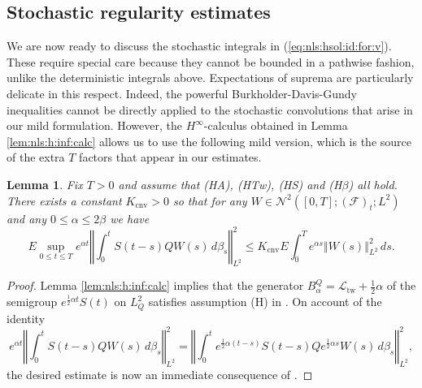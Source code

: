 \documentclass[10pt]{articleHJ}
\newcommand{\norm}[1]{\left\Vert#1\right\Vert}		%
\newcommand{\sref}[1]{(\ref{#1})}                       %
\newtheorem{lem}[thm]{Lemma}
\numberwithin{equation}{section}
\begin{document}
\subsection{Stochastic regularity estimates}
\label{sec:nls:reg:ests:st}

We are now ready to discuss the stochastic integrals
in \sref{eq:nls:hsol:id:for:v}.
These require special care because they cannot be bounded
in a pathwise fashion, unlike the deterministic integrals above.
Expectations of suprema are particularly delicate in this respect.
Indeed, the powerful Burkholder-Davis-Gundy inequalities cannot
be directly applied to the stochastic convolutions that arise in our
mild formulation. However, the $H^\infty$-calculus obtained
in Lemma \ref{lem:nls:h:inf:calc}
allows us to use the following mild version,
which is the source of the extra $T$ factors
that appear in our estimates.





\begin{lem}
\label{lem:nls:mild:regularity}
Fix $T > 0$ and assume that (HA), (HTw), (HS) and (H$\beta$)
all hold.
There exists a constant $K_{\mathrm{cnv}} > 0$ so that for any
$W \in \mathcal{N}^2([0,T];(\mathcal{F})_{t} ; L^2)$
and any $0 \le \alpha \le 2 \beta$ we have
\begin{equation}
E \sup_{0 \le t \le T} e^{\alpha t}
  \norm{ \int_0^t S( t - s) Q W(s) \, d \beta_s }_{L^2}^2
  \le K_{\mathrm{cnv}} E \int_0^T e^{\alpha s} \norm{W(s)}_{L^2}^2 \, d s.
\end{equation}
\end{lem}
\begin{proof}
Lemma \ref{lem:nls:h:inf:calc} implies that the generator
$B^Q_{\alpha} = \mathcal{L}_{\mathrm{tw}} + \frac{1}{2}\alpha$ of the
semigroup $e^{\frac{1}{2} \alpha t} S(t)$
on $L^2_Q$ satisfies assumption (H) in \cite{veraar2011note}.
On account of the identity
\begin{equation}
e^{\alpha t}
  \norm{ \int_0^t S( t - s) Q W(s) \, d \beta_s }_{L^2}^2
= \norm{ \int_0^t e^{\frac{1}{2} \alpha(t-s)}S( t - s) Q e^{\frac{1}{2} \alpha s} W(s) \, d \beta_s }_{L^2}^2,
\end{equation}
the desired estimate is now an immediate consequence of
\cite[Thm. 1.1]{veraar2011note}.
\end{proof}
\end{document}
